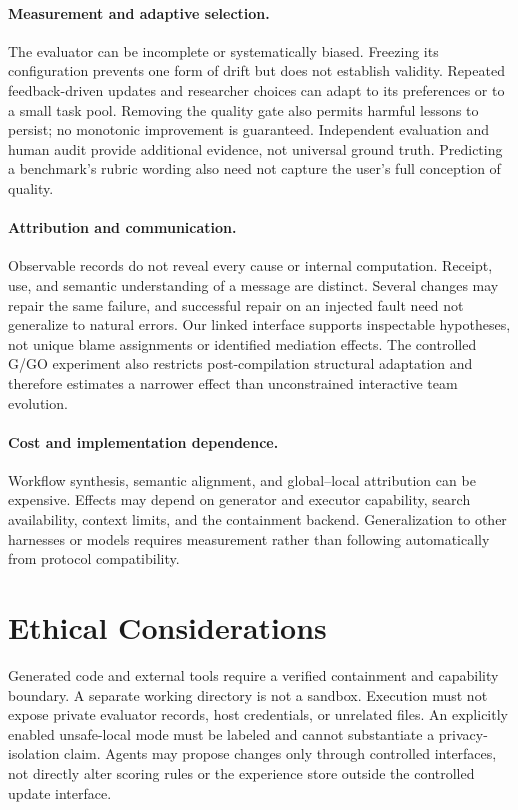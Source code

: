 \documentclass[11pt]{article}
\begin{document}
\paragraph{Measurement and adaptive selection.}
The evaluator can be incomplete or systematically biased. Freezing its configuration prevents one form of drift but does not establish validity. Repeated feedback-driven updates and researcher choices can adapt to its preferences or to a small task pool. Removing the quality gate also permits harmful lessons to persist; no monotonic improvement is guaranteed. Independent evaluation and human audit provide additional evidence, not universal ground truth. Predicting a benchmark's rubric wording also need not capture the user's full conception of quality.

\paragraph{Attribution and communication.}
Observable records do not reveal every cause or internal computation. Receipt, use, and semantic understanding of a message are distinct. Several changes may repair the same failure, and successful repair on an injected fault need not generalize to natural errors. Our linked interface supports inspectable hypotheses, not unique blame assignments or identified mediation effects. The controlled G/GO experiment also restricts post-compilation structural adaptation and therefore estimates a narrower effect than unconstrained interactive team evolution.

\paragraph{Cost and implementation dependence.}
Workflow synthesis, semantic alignment, and global--local attribution can be expensive. Effects may depend on generator and executor capability, search availability, context limits, and the containment backend. Generalization to other harnesses or models requires measurement rather than following automatically from protocol compatibility.

\section*{Ethical Considerations}

Generated code and external tools require a verified containment and capability boundary. A separate working directory is not a sandbox. Execution must not expose private evaluator records, host credentials, or unrelated files. An explicitly enabled unsafe-local mode must be labeled and cannot substantiate a privacy-isolation claim. Agents may propose changes only through controlled interfaces, not directly alter scoring rules or the experience store outside the controlled update interface.
\end{document}
